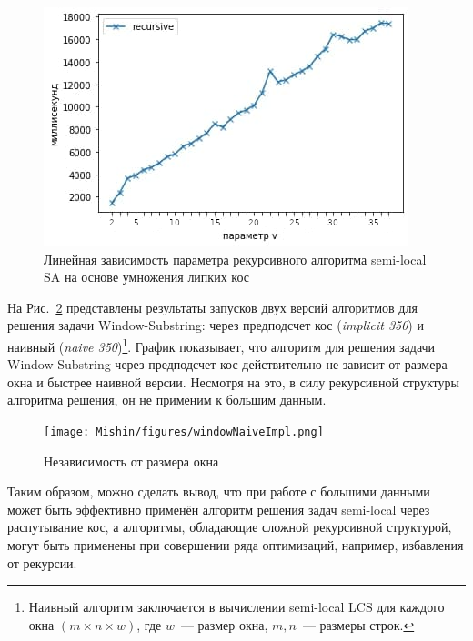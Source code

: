 \begin{figure}[t!]
\centering
    \includegraphics[width=0.8\columnwidth]{Mishin/figures/vDependenceImplicitSemiLocalSARecursie.png}
    \caption{Линейная зависимость параметра рекурсивного алгоритма semi-local SA на основе умножения липких кос }\label{fig:vParam}
\end{figure}

На Рис.~\ref{fig:speedWindow3} представлены результаты запусков двух версий алгоритмов для решения задачи Window-Substring: через предподсчет кос (\emph{implicit 350}) и наивный (\emph{naive 350})\footnote{Наивный алгоритм заключается в вычислении semi-local LCS для каждого окна $(m \times n \times w)$, где $w$~--- размер окна, $m,n$~--- размеры строк.
}.
График  показывает, что алгоритм для решения задачи Window-Substring через предподсчет кос действительно не зависит от размера окна и быстрее наивной версии.
Несмотря на это, в силу рекурсивной структуры алгоритма решения, он не применим к большим данным.

\begin{figure}[t!]
\centering
    \texttt{[image: Mishin/figures/windowNaiveImpl.png]}
    \caption{Независимость от размера окна }\label{fig:speedWindow3}
\end{figure}

Таким образом, можно сделать вывод, что  при работе с большими данными может быть эффективно применён алгоритм решения задач semi-local через распутывание кос, а алгоритмы, обладающие сложной рекурсивной структурой, могут быть применены при совершении ряда оптимизаций, например, избавления от рекурсии.


